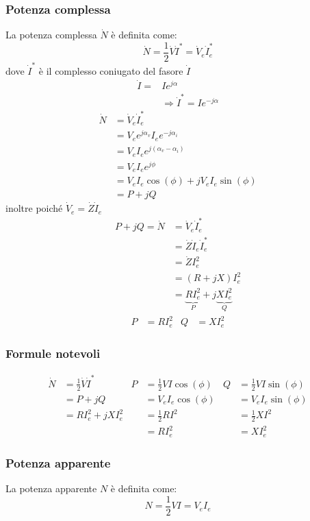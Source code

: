 \documentclass{article}
\begin{document}
\subsubsection{Potenza complessa}
La potenza complessa $\dot N$ è definita come:
\[\dot N = \frac{1}{2} \dot V \dot I^* = \dot V_e \dot I_e^*\]
dove $\dot I^*$ è il complesso coniugato del fasore $\dot I$
\begin{align*}
    \dot I =& I e^{j \alpha}
    \\
    &\Longrightarrow \dot I^* = I e^{-j \alpha}
\end{align*}
\begin{align*}
    \dot N &= \dot V_e \dot I_e^*\\
    &=V_ee^{j\alpha_v}I_e e^{-j \alpha_i} \\
    &=V_eI_e e^{j(\alpha_v-\alpha_i)}\\
    &=V_eI_e e^{j\phi}\\
    &= V_eI_e \cos(\phi) + jV_eI_e\sin(\phi)\\
    &= P+jQ
\end{align*}
inoltre poiché $\dot V_e=\dot Z \dot I_e$
\begin{align*}
    P+jQ=\dot N &= \dot V_e \dot I_e^*\\
    &=\dot Z \dot I_e\dot I_e^*\\
    &=\dot Z I_e^2\\
    &=(R+jX)I_e^2\\
    &=\underbrace{RI_e^2}_{P}+j\underbrace{XI_e^2}_{Q}
\end{align*}
\begin{align*}
    P &= RI_e^2 & Q &= XI_e^2
\end{align*}

\subsubsection{Formule notevoli}
\begin{align*}
    \dot N &= \frac{1}{2} \dot V \dot I^*
    &
    P &= \frac{1}{2}VI \cos(\phi)
    & 
    Q &= \frac{1}{2} VI \sin(\phi)
    \\
    &= P+jQ
    &
    &= V_eI_e \cos(\phi)
    &
    &=V_eI_e \sin(\phi)
    \\
    &=RI_e^2 + j XI_e^2
    &
    &= \frac{1}{2}RI^2
    &
    &= \frac{1}{2}XI^2
    \\
    & &
    &= RI_e^2
    &
    &= XI_e^2
\end{align*}

\subsubsection{Potenza apparente}
La potenza apparente $N$ è definita come:
\[N = \frac{1}{2}VI=V_eI_e\]
\end{document}
